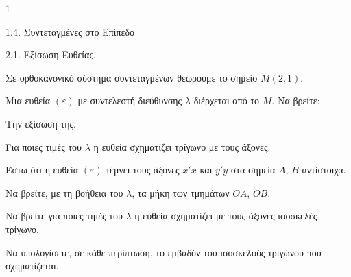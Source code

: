 \begin{ylh}{1}
    \item 1.4. Συντεταγμένες στο Επίπεδο
    \item 2.1. Εξίσωση Ευθείας.
\end{ylh}
Σε ορθοκανονικό σύστημα συντεταγμένων θεωρούμε το σημείο $M(2, 1)$.
\begin{alist}
    \item Μια ευθεία $(\varepsilon)$ με συντελεστή διεύθυνσης $\lambda$ διέρχεται από το $M$. Να βρείτε:
    \begin{rlist}
        \item Την εξίσωση της. 
        \item Για ποιες τιμές του $\lambda$ η ευθεία σχηματίζει τρίγωνο με τους άξονες. 
    \end{rlist}
    \item Έστω ότι η ευθεία $(\varepsilon)$ τέμνει τους άξονες $x'x$ και $y'y$ στα σημεία $A$, $B$ αντίστοιχα.
    \begin{rlist}
        \item Να βρείτε, με τη βοήθεια του $\lambda$, τα μήκη των τμημάτων $OA$, $OB$. 
        \item Να βρείτε για ποιες τιμές του $\lambda$ η ευθεία σχηματίζει με τους άξονες ισοσκελές τρίγωνο. 
        \item Να υπολογίσετε, σε κάθε περίπτωση, το εμβαδόν του ισοσκελούς τριγώνου που σχηματίζεται. 
    \end{rlist}
\end{alist}